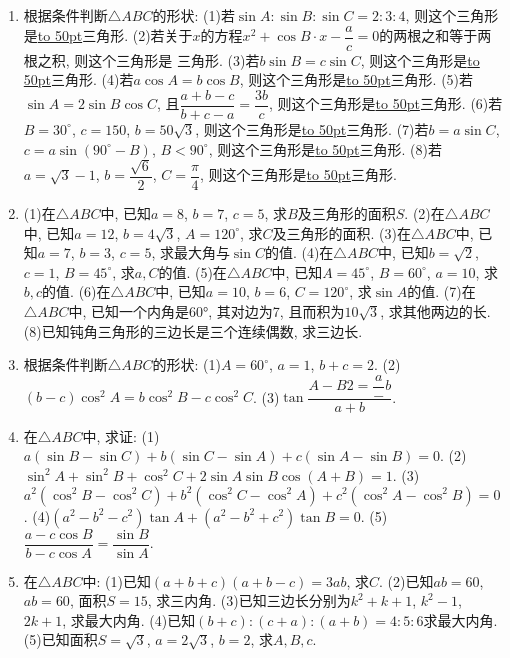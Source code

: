 \documentclass[10pt,a4paper]{article}
\newcommand{\blank}[1]{\underline{\hbox to #1pt{}}}
\begin{document}
\begin{enumerate}[1.]
(2)若面积$S=\dfrac 14$, 外接圆半径$R=1$, 则$abc=$\blank{50}.
(3)若$\dfrac a{\sin A}=2$, 则$\dfrac{a+b+c}{\sin A+\sin B+\sin C}=$\blank{50}.
(4)若$(b+c):(c+a):(a+b)=4:5:6$, 则$\sin A:\sin B:\sin C=$\blank{50}.
(5)若$A=105^\circ$, $B=30^\circ$, $BC=\dfrac{\sqrt 6}2$, 则的$B$分线的长为\blank{50}.
(6)若$BC$边上的中线$m=\sqrt {\dfrac{8-3\sqrt 3}2}$, 且$a=\sqrt 3+1$, $b=\sqrt 6$, 则$B=$\blank{50}.
\item 根据条件判断$\triangle ABC$的形状:
(1)若$\sin A:\sin B:\sin C=2:3:4$, 则这个三角形是\blank{50}三角形.
(2)若关于$x$的方程$x^2+\cos B\cdot x-\dfrac ac=0$的两根之和等于两根之积, 则这个三角形是   三角形.
(3)若$b\sin B=c\sin C$, 则这个三角形是\blank{50}三角形.
(4)若$a\cos A=b\cos B$, 则这个三角形是\blank{50}三角形.
(5)若$\sin A=2\sin B\cos C$, 且$\dfrac{a+b-c}{b+c-a}=\dfrac{3b}c$, 则这个三角形是\blank{50}三角形.
(6)若$B=30^\circ$, $c=150$, $b=50\sqrt 3$, 则这个三角形是\blank{50}三角形.
(7)若$b=a\sin C$, $c=a\sin (90^\circ -B)$, $B<90^\circ$, 则这个三角形是\blank{50}三角形.
(8)若$a=\sqrt 3-1$, $b=\dfrac{\sqrt 6}2$, $C=\dfrac{\pi }4$, 则这个三角形是\blank{50}三角形.
\item (1)在$\triangle ABC$中, 已知$a=8$, $b=7$, $c=5$, 求$B$及三角形的面积$S$.
(2)在$\triangle ABC$中, 已知$a=12$, $b=4\sqrt 3$, $A=120^\circ$, 求$C$及三角形的面积.
(3)在$\triangle ABC$中, 已知$a=7$, $b=3$, $c=5$, 求最大角与$\sin C$的值.
(4)在$\triangle ABC$中, 已知$b=\sqrt 2$, $c=1$, $B=45^\circ$, 求$a,C$的值.
(5)在$\triangle ABC$中, 已知$A=45^\circ$, $B=60^\circ$, $a=10$, 求$b,c$的值.
(6)在$\triangle ABC$中, 已知$a=10$, $b=6$, $C=120^\circ$, 求$\sin A$的值.
(7)在$\triangle ABC$中, 已知一个内角是60°, 其对边为7, 且而积为$10\sqrt 3$, 求其他两边的长.
(8)已知钝角三角形的三边长是三个连续偶数, 求三边长.
\item 根据条件判断$\triangle ABC$的形状:
(1)$A=60^{\circ }$, $a=1$, $b+c=2$.			(2)$(b-c)\cos ^2A=b\cos ^2B-c\cos ^2C$.
(3)$\tan \dfrac{A-B2=\dfrac a-b}{a+b}$.
\item 在$\triangle ABC$中, 求证:
(1)$a(\sin B-\sin C)+b(\sin C-\sin A)+c(\sin A-\sin B)=0$.
(2)$\sin ^2A+\sin ^2B+\cos ^2C+2\sin A\sin B\cos (A+B)=1$.
(3)$a^2(\cos ^2B-\cos ^2C)+b^2(\cos ^2C-\cos ^2A)+c^2(\cos ^2A-\cos ^2B)=0$.
(4)$(a^2-b^2-c^2)\tan A+(a^2-b^2+c^2)\tan B=0$.
(5)$\dfrac{a-c\cos B}{b-c\cos A}=\dfrac{\sin B}{\sin A}$.
\item 在$\triangle ABC$中:
(1)已知$(a+b+c)(a+b-c)=3ab$, 求$C$.
(2)已知$ab=60$, $ab=60$, 面积$S=15$, 求三内角.
(3)已知三边长分别为$k^2+k+1$, $k^2-1$, $2k+1$, 求最大内角.
(4)已知$(b+c):(c+a):(a+b)=4:5:6$求最大内角.
(5)已知面积$S=\sqrt 3$, $a=2\sqrt 3$, $b=2$, 求$A,B,c$.

\end{enumerate}
\end{document}
